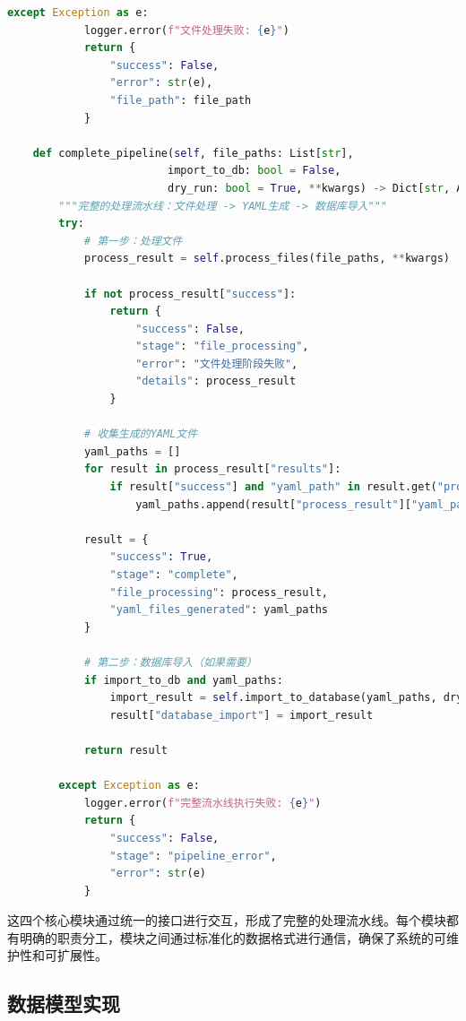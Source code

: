 \begin{lstlisting}[language=Python, label=fig:universal_import]
        except Exception as e:
            logger.error(f"文件处理失败: {e}")
            return {
                "success": False,
                "error": str(e),
                "file_path": file_path
            }
    
    def complete_pipeline(self, file_paths: List[str], 
                         import_to_db: bool = False, 
                         dry_run: bool = True, **kwargs) -> Dict[str, Any]:
        """完整的处理流水线：文件处理 -> YAML生成 -> 数据库导入"""
        try:
            # 第一步：处理文件
            process_result = self.process_files(file_paths, **kwargs)
            
            if not process_result["success"]:
                return {
                    "success": False,
                    "stage": "file_processing",
                    "error": "文件处理阶段失败",
                    "details": process_result
                }
            
            # 收集生成的YAML文件
            yaml_paths = []
            for result in process_result["results"]:
                if result["success"] and "yaml_path" in result.get("process_result", {}):
                    yaml_paths.append(result["process_result"]["yaml_path"])
            
            result = {
                "success": True,
                "stage": "complete",
                "file_processing": process_result,
                "yaml_files_generated": yaml_paths
            }
            
            # 第二步：数据库导入（如果需要）
            if import_to_db and yaml_paths:
                import_result = self.import_to_database(yaml_paths, dry_run)
                result["database_import"] = import_result
            
            return result
            
        except Exception as e:
            logger.error(f"完整流水线执行失败: {e}")
            return {
                "success": False,
                "stage": "pipeline_error",
                "error": str(e)
            }
\end{lstlisting}

这四个核心模块通过统一的接口进行交互，形成了完整的处理流水线。每个模块都有明确的职责分工，模块之间通过标准化的数据格式进行通信，确保了系统的可维护性和可扩展性。


\subsection{数据模型实现}

